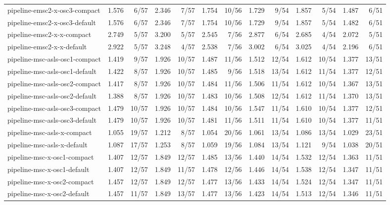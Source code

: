 \begin{tabular}{lrrrrrrrrrrrr}
pipeline-emsc2-x-osc3-compact & 1.576 & 6/57 & 2.346 & 7/57 & 1.754 & 10/56 & 1.729 & 9/54 & 1.857 & 5/54 & 1.487 & 6/51 \\
pipeline-emsc2-x-osc3-default & 1.576 & 6/57 & 2.346 & 7/57 & 1.754 & 10/56 & 1.729 & 9/54 & 1.857 & 5/54 & 1.482 & 6/51 \\
pipeline-emsc2-x-x-compact & 2.749 & 5/57 & 3.200 & 5/57 & 2.545 & 7/56 & 2.877 & 6/54 & 2.685 & 4/54 & 2.072 & 5/51 \\
pipeline-emsc2-x-x-default & 2.922 & 5/57 & 3.248 & 4/57 & 2.538 & 7/56 & 3.002 & 6/54 & 3.025 & 4/54 & 2.196 & 6/51 \\
pipeline-msc-asls-osc1-compact & 1.419 & 9/57 & 1.926 & 10/57 & 1.487 & 11/56 & 1.512 & 12/54 & 1.612 & 10/54 & 1.377 & 13/51 \\
pipeline-msc-asls-osc1-default & 1.422 & 8/57 & 1.926 & 10/57 & 1.485 & 9/56 & 1.518 & 13/54 & 1.612 & 11/54 & 1.377 & 12/51 \\
pipeline-msc-asls-osc2-compact & 1.417 & 8/57 & 1.926 & 10/57 & 1.484 & 11/56 & 1.506 & 11/54 & 1.612 & 10/54 & 1.367 & 13/51 \\
pipeline-msc-asls-osc2-default & 1.388 & 8/57 & 1.926 & 10/57 & 1.483 & 10/56 & 1.508 & 12/54 & 1.612 & 11/54 & 1.370 & 13/51 \\
pipeline-msc-asls-osc3-compact & 1.479 & 10/57 & 1.926 & 10/57 & 1.484 & 10/56 & 1.547 & 11/54 & 1.610 & 10/54 & 1.377 & 12/51 \\
pipeline-msc-asls-osc3-default & 1.479 & 10/57 & 1.926 & 10/57 & 1.481 & 11/56 & 1.511 & 11/54 & 1.610 & 10/54 & 1.377 & 11/51 \\
pipeline-msc-asls-x-compact & 1.055 & 19/57 & 1.212 & 8/57 & 1.054 & 20/56 & 1.061 & 13/54 & 1.086 & 13/54 & 1.029 & 23/51 \\
pipeline-msc-asls-x-default & 1.087 & 17/57 & 1.253 & 8/57 & 1.059 & 19/56 & 1.084 & 13/54 & 1.121 & 9/54 & 1.038 & 20/51 \\
pipeline-msc-x-osc1-compact & 1.407 & 12/57 & 1.849 & 12/57 & 1.485 & 13/56 & 1.440 & 14/54 & 1.532 & 12/54 & 1.363 & 11/51 \\
pipeline-msc-x-osc1-default & 1.407 & 12/57 & 1.849 & 11/57 & 1.478 & 12/56 & 1.446 & 14/54 & 1.538 & 12/54 & 1.347 & 11/51 \\
pipeline-msc-x-osc2-compact & 1.457 & 12/57 & 1.849 & 12/57 & 1.477 & 13/56 & 1.433 & 14/54 & 1.524 & 12/54 & 1.347 & 11/51 \\
pipeline-msc-x-osc2-default & 1.457 & 11/57 & 1.849 & 13/57 & 1.477 & 13/56 & 1.423 & 14/54 & 1.513 & 12/54 & 1.346 & 11/51 \\

\end{tabular}
